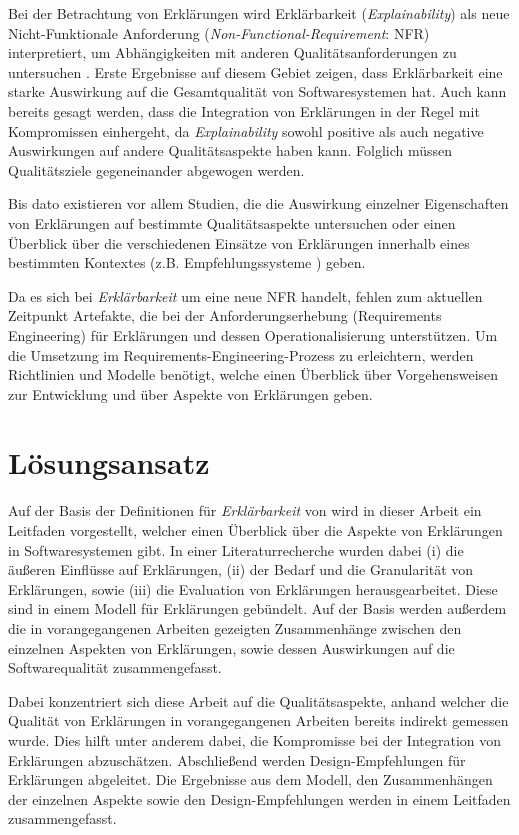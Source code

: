 Bei der Betrachtung von Erklärungen wird Erklärbarkeit (\textit{Explainability}) als neue Nicht-Funktionale Anforderung (\textit{Non-Functional-Requirement}: NFR) interpretiert, um Abhängigkeiten mit anderen Qualitätsanforderungen zu untersuchen \cite{kohl_explainability_2019, chazette2020explainability}. Erste Ergebnisse auf diesem Gebiet zeigen, dass Erklärbarkeit eine starke Auswirkung auf die Gesamtqualität von Softwaresystemen hat. Auch kann bereits gesagt werden, dass die Integration von Erklärungen in der Regel mit Kompromissen einhergeht, da \textit{Explainability} sowohl positive als auch negative Auswirkungen auf andere Qualitätsaspekte haben kann. Folglich müssen Qualitätsziele gegeneinander abgewogen werden.

Bis dato existieren vor allem Studien, die die Auswirkung einzelner Eigenschaften von Erklärungen auf bestimmte Qualitätsaspekte untersuchen oder einen Überblick über die verschiedenen Einsätze von Erklärungen innerhalb eines bestimmten Kontextes (z.B. Empfehlungssysteme \cite{nunes_systematic_2017}) geben.

Da es sich bei \textit{Erklärbarkeit} um eine neue NFR handelt, fehlen zum aktuellen Zeitpunkt Artefakte, die bei der Anforderungserhebung (Requirements Engineering) für Erklärungen und dessen Operationalisierung unterstützen. Um die Umsetzung im Requirements-Engineering-Prozess zu erleichtern, werden Richtlinien und Modelle benötigt, welche einen Überblick über Vorgehensweisen zur Entwicklung und über Aspekte von Erklärungen geben. 

\section{Lösungsansatz}

Auf der Basis der Definitionen für \textit{Erklärbarkeit} von \citeauthor[]{chazette_knowledge_nodate} wird in dieser Arbeit ein Leitfaden vorgestellt, welcher einen Überblick über die Aspekte von Erklärungen in Softwaresystemen gibt. In einer Literaturrecherche wurden dabei (i) die äußeren Einflüsse auf Erklärungen, (ii) der Bedarf und die Granularität von Erklärungen, sowie (iii) die Evaluation von Erklärungen herausgearbeitet. Diese sind in einem Modell für Erklärungen gebündelt. Auf der Basis werden außerdem die in vorangegangenen Arbeiten gezeigten Zusammenhänge zwischen den einzelnen Aspekten von Erklärungen, sowie dessen Auswirkungen auf die Softwarequalität zusammengefasst.

Dabei konzentriert sich diese Arbeit auf die Qualitätsaspekte, anhand welcher die Qualität von Erklärungen in vorangegangenen Arbeiten bereits indirekt gemessen wurde. Dies hilft unter anderem dabei, die Kompromisse bei der Integration von Erklärungen abzuschätzen. Abschließend werden  Design-Empfehlungen für Erklärungen abgeleitet. Die Ergebnisse aus dem Modell, den Zusammenhängen der einzelnen Aspekte sowie den Design-Empfehlungen werden in einem Leitfaden zusammengefasst.

